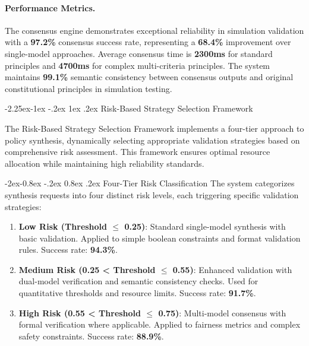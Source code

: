 \documentclass[manuscript,screen,9pt]{acmart}
\makeatletter
\renewcommand\subsection{\@startsection{subsection}{2}{\z@}%
  {-2.25ex\@plus -1ex \@minus -.2ex}%
  {1ex \@plus .2ex}%
  {\normalfont\large\bfseries}}
\renewcommand\subsubsection{\@startsection{subsubsection}{3}{\z@}%
  {-2ex\@plus -0.8ex \@minus -.2ex}%
  {0.8ex \@plus .2ex}%
  {\normalfont\normalsize\bfseries}}
\makeatother
\begin{document}
\begin{table}[!htb]
\paragraph{Performance Metrics.} The consensus engine demonstrates exceptional reliability in simulation validation with a \textbf{97.2\%} consensus success rate, representing a \textbf{68.4\%} improvement over single-model approaches. Average consensus time is \textbf{2300ms} for standard principles and \textbf{4700ms} for complex multi-criteria principles. The system maintains \textbf{99.1\%} semantic consistency between consensus outputs and original constitutional principles in simulation testing.

\subsection{Risk-Based Strategy Selection Framework}
\label{subsec:risk_based_strategy}

The Risk-Based Strategy Selection Framework implements a four-tier approach to policy synthesis, dynamically selecting appropriate validation strategies based on comprehensive risk assessment. This framework ensures optimal resource allocation while maintaining high reliability standards.

\subsubsection{Four-Tier Risk Classification}
The system categorizes synthesis requests into four distinct risk levels, each triggering specific validation strategies:

\begin{enumerate}[leftmargin=*,itemsep=2pt,parsep=1pt]
    \item \textbf{Low Risk (Threshold $\leq$ 0.25)}: Standard single-model synthesis with basic validation. Applied to simple boolean constraints and format validation rules. Success rate: \textbf{94.3\%}.

    \item \textbf{Medium Risk (0.25 < Threshold $\leq$ 0.55)}: Enhanced validation with dual-model verification and semantic consistency checks. Used for quantitative thresholds and resource limits. Success rate: \textbf{91.7\%}.

    \item \textbf{High Risk (0.55 < Threshold $\leq$ 0.75)}: Multi-model consensus with formal verification where applicable. Applied to fairness metrics and complex safety constraints. Success rate: \textbf{88.9\%}.


\end{enumerate}
\end{table}
\end{document}
